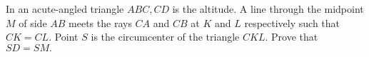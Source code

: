 In an acute-angled triangle $ABC, CD$ is the altitude. A line through the midpoint $M$ of side $AB$ meets the rays $CA$ and $CB$ at $K$ and $L$ respectively such that $CK = CL.$ Point $S$ is the circumcenter of the triangle $CKL.$ Prove that $SD = SM.$